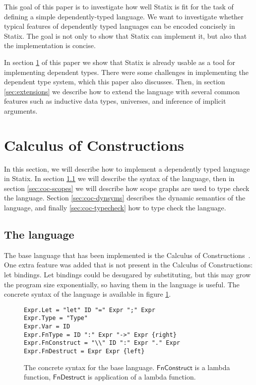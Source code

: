 \documentclass[a4paper,UKenglish,cleveref, autoref, thm-restate]{oasics-v2021}
\newcommand{\co}[1]{ \mathsf{#1} }
\begin{document}
This goal of this paper is to investigate how well Statix is fit for the task of defining a simple dependently-typed language. We want to investigate whether typical features of dependently typed languages can be encoded concisely in Statix. The goal is not only to show that Statix can implement it, but also that the implementation is concise.

In section \ref{sec:coc} of this paper we show that Statix is already usable as a tool for implementing dependent types. There were some challenges in implementing the dependent type system, which this paper also discusses. Then, in section \ref{sec:extensions} we describe how to extend the language with several common features such as inductive data types, universes, and inference of implicit arguments.

\section{Calculus of Constructions}
\label{sec:coc}

In this section, we will describe how to implement a dependently typed language in Statix. In section \ref{sec:coc-syntax} we will describe the syntax of the language, then in section \ref{sec:coc-scopes} we will describe how scope graphs are used to type check the language. Section \ref{sec:coc-dynsyms} describes the dynamic semantics of the language, and finally \ref{sec:coc-typecheck} how to type check the language. 

\subsection{The language}
\label{sec:coc-syntax}

The base language that has been implemented is the Calculus of Constructions~\cite{Coquand_Huet_1988}. One extra feature was added that is not present in the Calculus of Constructions: let bindings. Let bindings could be desugared by substituting, but this may grow the program size exponentially, so having them in the language is useful. The concrete syntax of the language is available in figure \ref{fig:syntax}.

\begin{figure}[h]
\begin{lstlisting}
Expr.Let = "let" ID "=" Expr ";" Expr
Expr.Type = "Type"
Expr.Var = ID
Expr.FnType = ID ":" Expr "->" Expr {right}
Expr.FnConstruct = "\\" ID ":" Expr "." Expr
Expr.FnDestruct = Expr Expr {left}
\end{lstlisting}
\caption{The concrete syntax for the base language. $\co{FnConstruct}$ is a lambda function, $\co{FnDestruct}$ is application of a lambda function.}
\label{fig:syntax}
\end{figure}
\end{document}
